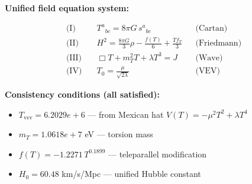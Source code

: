 
\textbf{Unified field equation system:}

\begin{align}
  \text{(I)} \quad & T^a{}_{bc} = 8\pi G \, s^a{}_{bc} && \text{(Cartan)} \\
  \text{(II)} \quad & H^2 = \frac{8\pi G}{3}\rho - \frac{f(T)}{6} + \frac{Tf_T}{3} && \text{(Friedmann)} \\
  \text{(III)} \quad & \Box T + m_T^2 T + \lambda T^3 = J && \text{(Wave)} \\
  \text{(IV)} \quad & T_0 = \frac{\mu}{\sqrt{2\lambda}} && \text{(VEV)}
\end{align}

\textbf{Consistency conditions (all satisfied):}
\begin{itemize}
  \item $T_{\text{vev}} = 6.2029e+6$ — from Mexican hat $V(T) = -\mu^2 T^2 + \lambda T^4$
  \item $m_T = 1.0618e+7$ eV — torsion mass
  \item $f(T) = -1.2271 \, T^{0.1899}$ — teleparallel modification
  \item $H_0 = 60.48$ km/s/Mpc — unified Hubble constant
\end{itemize}